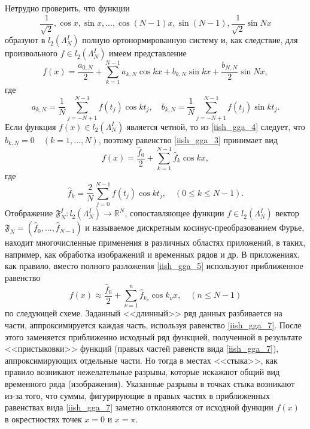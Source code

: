 Нетрудно проверить, что функции
\begin{equation}
\frac{1}{\sqrt{2}}, \cos x, \sin x, ..., \cos (N-1)x, \sin (N-1), \frac{1}{\sqrt{2}}\sin Nx \label{iish_gga_2}
\end{equation}
образуют в $l_2(\Lambda^I_N)$ полную ортонормированную систему и, как следствие, для произвольного $f \in l_2(\Lambda^I_N)$ имеем представление
\begin{equation}
f(x) = \frac{a_{0,N}}{2} + \sum\limits_{k=1}^{N-1} a_{k,N}\cos kx + b_{k,N}\sin kx + \frac{b_{N,N}}{2}\sin Nx, \label{iish_gga_3}
\end{equation}
где
\begin{equation}
a_{k,N}=\frac{1}{N}\sum\limits_{j=-N+1}^{N-1} f(t_j)\cos kt_j, \quad b_{k,N}=\frac{1}{N}\sum\limits_{j=-N+1}^{N-1} f(t_j)\sin kt_j. \label{iish_gga_4}
\end{equation}
Если функция $f(x) \in l_2(\Lambda^I_N)$ является четной, то из \eqref{iish_gga_4} следует, что $b_{k,N} = 0 \quad (k = 1,...,N)$, поэтому равенство \eqref{iish_gga_3} принимает вид
\begin{equation}
f(x) = \frac{\hat{f}_0}{2} + \sum\limits_{k=1}^{N-1} \hat{f}_k \cos kx, \label{iish_gga_5}
\end{equation}
где
\begin{equation}
\hat{f}_k = \frac{2}{N}\sum\limits_{j=0}^{N-1} f(t_j)\cos kt_j, \quad (0 \le k \le N-1). \label{iish_gga_6}
\end{equation}
Отображение $\mathfrak{F}_N^I : l_2(\Lambda^I_N) \rightarrow \mathbb{R}^N $, сопоставляющее функции $f \in l_2(\Lambda^I_N)$ вектор
$\mathfrak{F}_N = (\hat{f}_0,...,\hat{f}_{N-1})$ и называемое дискретным косинус-преобразованием Фурье, находит многочисленные применения
в различных областях приложений, в таких, например, как обработка изображений и временных рядов и др. В приложениях, как правило, вместо полного разложения
\eqref{iish_gga_5} используют приближенное равенство
\begin{equation}
f(x) \approx \frac{\hat{f}_0}{2} + \sum\limits_{\nu=1}^n \hat{f}_{k_\nu} \cos k_\nu x, \quad (n \leq N - 1) \label{iish_gga_7}
\end{equation}
по следующей схеме. Заданный <<длинный>> ряд данных разбивается на части, аппроксимируется каждая часть, используя равенство \eqref{iish_gga_7}. После этого заменяется
приближенно исходный ряд функцией, полученной в результате <<пристыковки>> функций (правых частей равенств вида \eqref{iish_gga_7}), аппроксимирующих отдельные части.
Но тогда в местах <<стыка>>, как правило возникают нежелательные разрывы, которые искажают общий вид временного ряда (изображения). Указанные разрывы в точках стыка возникают из-за того, что суммы, фигурирующие в правых частях в приближенных равенствах вида \eqref{iish_gga_7} заметно отклоняются от исходной функции $f(x)$ в
окрестностях точек $x = 0$ и $x = \pi$.


